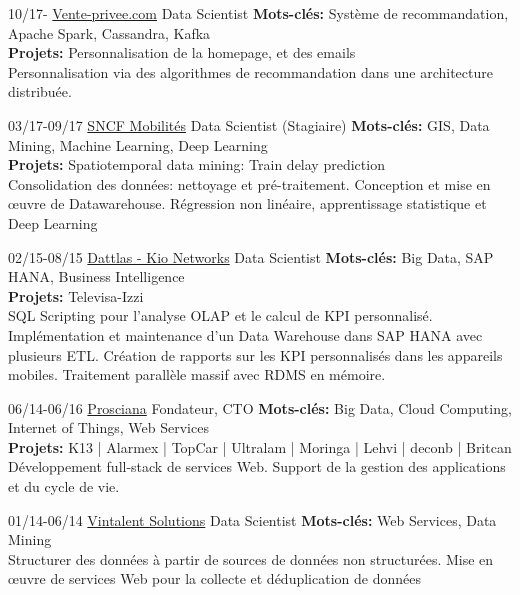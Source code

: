 \documentclass[]{friggeri-cv}
\begin{document}
\begin{entrylist}	
\entry
{10/17- }
{\href{http://vente-privee.com}{Vente-privee.com}}
{Data Scientist} 
{\textbf{Mots-clés:} Système de recommandation, Apache Spark, Cassandra, Kafka\\
	\textbf{Projets:} Personnalisation de la homepage, et des emails \\
	Personnalisation via des algorithmes de recommandation dans une architecture distribuée.  
}	
	
\entry
{03/17-09/17}
{\href{http://www.sncf.com/}{SNCF Mobilités}}
{Data Scientist (Stagiaire)}  
{\textbf{Mots-clés:} GIS, Data Mining, Machine Learning, Deep Learning\\
	\textbf{Projets:} Spatiotemporal data mining: Train delay prediction \\
	Consolidation des données: nettoyage et pré-traitement.
	Conception et mise en œuvre de Datawarehouse.
	Régression non linéaire, apprentissage statistique et Deep Learning
}

	
	
\entry
{02/15-08/15}
{\href{http://www.dattlas.com}{Dattlas - Kio Networks}}
{Data Scientist} 
{\textbf{Mots-clés:} Big Data, SAP HANA, Business Intelligence\\
\textbf{Projets:} Televisa-Izzi \\
SQL Scripting pour l'analyse OLAP et le calcul de KPI personnalisé.
Implémentation et maintenance d'un Data Warehouse dans SAP HANA avec plusieurs ETL.
Création de rapports sur les KPI personnalisés dans les appareils mobiles.
Traitement parallèle massif avec RDMS en mémoire.
}

\entry
{06/14-06/16}
{\href{http://www.prosciana.com}{Prosciana}}
{Fondateur, CTO} 
{\textbf{Mots-clés:} Big Data, Cloud Computing, Internet of Things, Web Services\\
\textbf{Projets:} K13 | Alarmex | TopCar | Ultralam | Moringa | Lehvi | deconb | Britcan\\
Développement full-stack de services Web.
Support de la gestion des applications et du cycle de vie.
}

\entry
{01/14-06/14}
{\href{http://www.vintalent.com}{Vintalent Solutions}}
{Data Scientist}
{\textbf{Mots-clés:} Web Services, Data Mining\\
	Structurer des données à partir de sources de données non structurées.
	Mise en œuvre de services Web pour la collecte et déduplication de données
	}
\end{entrylist}
\end{document}
